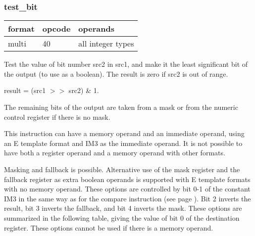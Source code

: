 \documentclass[forwardcom.tex]{subfiles}
\begin{document}
\subsubsection{test\_bit}
\label{table:testBitInstruction}
\begin{tabular}{|p{12mm}|p{12mm}|p{110mm}|}
\hline
\bfseries format & \bfseries opcode & \bfseries operands \\ \hline
multi & 40 & all integer types \\ \hline
\end{tabular}
\vspace{2mm}

Test the value of bit number src2 in src1, and make it the least significant bit of the output (to use as a boolean). The result is zero if src2 is out of range.
\vspace{2mm}

result = (src1 $>>$ src2) \& 1.
\vspace{2mm}

The remaining bits of the output are taken from a mask or from the numeric control register if there is no mask. 

\vspace{2mm}
This instruction can have a memory operand and an immediate operand, using an E template format and IM3 as the immediate operand. It is not possible to have both a register operand and a memory operand with other formats.

\vspace{2mm}
Masking and fallback is possible. Alternative use of the mask register and the fallback register as extra boolean operands is supported with E template formats with no memory operand. These options are controlled by bit 0-1 of the constant IM3 in the same way as for the compare instruction (see page \pageref{table:AlternativeFallbackForCompare}). Bit 2 inverts the result, bit 3 inverts the fallback, and bit 4 inverts the mask. These options are summarized in the following table, giving the value of bit 0 of the destination register. These options cannot be used if there is a memory operand.
\end{document}
